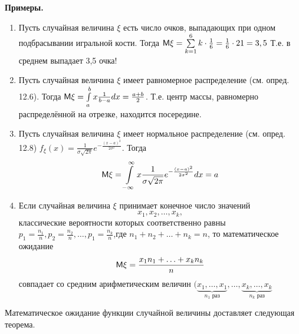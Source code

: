 \textbf{Примеры.}
	\begin{enumerate}
		\item Пусть случайная величина $\xi$ есть число очков, выпадающих при одном подбрасывании игральной кости. Тогда $\mathsf{M}\xi=\sum\limits_{k=1}^6k\cdot\frac{1}{6}=\frac{1}{6}\cdot21=3,5$ Т.е. в среднем выпадает 3,5 очка!

		\item Пусть случайная величина $\xi$ имеет равномерное распределение (см.
		опред. 12.6). Тогда $\mathsf{M}\xi=\int\limits_a^b x\frac{1}{b-a}dx=\frac{a+b}{2}$. Т.е. центр массы, равномерно распределённой на отрезке, находится посередине.

		\item Пусть случайная величина $\xi$ имеет нормальное распределение (см.
		опред. 12.8) $f_{\xi}(x)=\frac{1}{\sigma\sqrt{2\pi}}e^{-\frac{(x-a)^2}{2\sigma^2}}$. Тогда
			\begin{equation*}
				\mathsf{M}\xi=\int\limits_{-\infty}^{\infty} 
				x\frac{1}{\sigma\sqrt{2\pi}}
				e^{-\frac{(x-a)^2}{2\sigma^2}}dx=a
			\end{equation*}

		\item Если случайная величина $\xi$ принимает конечное число значений $$x_1,x_2,\ldots, x_k,$$ классические вероятности которых соответственно равны $p_1 =\frac{n_1}{n},p_2 =\frac{n_2}{n},\ldots,p_1 =\frac{n_k}{n}$,где $n_1 + n_2 + \ldots + n_k = n$, то математическое ожидание
		\begin{equation*}
			\mathsf{M} \xi=\frac{x_1n_1+\ldots+x_kn_k}{n}
		\end{equation*}
		совпадает со средним арифметическим величин 
		$(\underbrace{x_1,\ldots , x_1}_{n_1 \text{ раз}},\ldots,\underbrace{x_k,\ldots,x_k}_{n_k \text{ раз}} $
	\end{enumerate}


Математическое ожидание функции случайной величины доставляет
следующая теорема.

